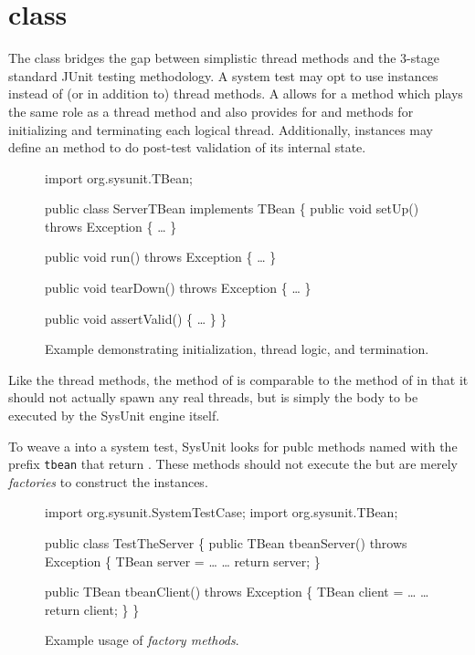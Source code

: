 \section{ class}

The  class bridges the gap between simplistic
thread methods and the 3-stage standard JUnit testing methodology.
A system test may opt to use  instances instead of
(or in addition to) thread methods.  A  allows
for a  method which plays the same role
as a thread method and also provides for 
and  methods for initializing and
terminating each logical thread.
Additionally,  instances may define an
 method to do post-test 
validation of its internal state.

\begin{figure}
\begin{codelisting}
import org.sysunit.TBean;

public class ServerTBean 
    implements TBean
\{
    public void setUp()
        throws Exception
    \{
        \dots
    \}

    public void run()
         throws Exception
    \{
        \dots
    \}

    public void tearDown()
        throws Exception
    \{
        \dots
    \}

    public void assertValid()
    \{
        \dots
    \}
\}
\end{codelisting}
\caption{Example  demonstrating initialization,
thread logic, and termination.}
\end{figure}

Like the thread methods, the  method of
 is comparable to the  method of
 in that it should not actually spawn any real
threads, but is simply the body to be executed by the SysUnit engine
itself. 

To weave a  into a system test, SysUnit looks for
publc methods named with the prefix \texttt{tbean} that return
.  These methods should not execute the 
but are merely \emph{factories} to
construct the  instances.

\begin{figure}
\begin{codelisting}
import org.sysunit.SystemTestCase;
import org.sysunit.TBean;

public class TestTheServer 
\{
    public TBean tbeanServer()
        throws Exception 
    \{
        TBean server = \dots
        \dots
        return server;
    \}

    public TBean tbeanClient()
        throws Exception 
    \{
        TBean client = \dots
        \dots
        return client;
    \}
\}
\end{codelisting}
\caption{Example usage of \emph{ factory methods}.}
\end{figure}
